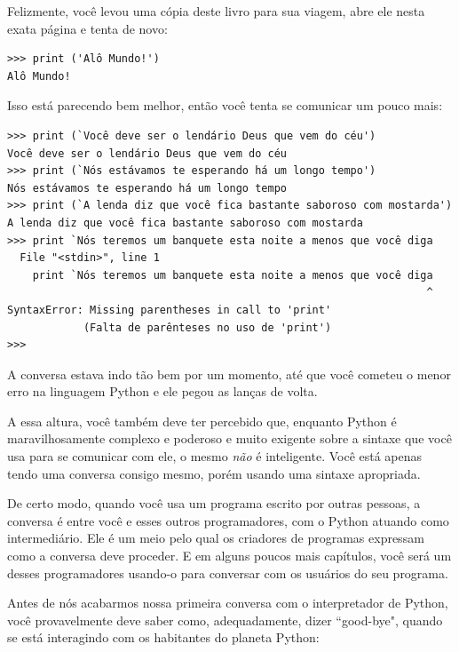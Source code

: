 Felizmente, você levou uma cópia deste livro para sua viagem, abre ele nesta exata página e tenta de novo:

\begin{verbatim}
>>> print ('Alô Mundo!')
Alô Mundo!
\end{verbatim}

%
Isso está parecendo bem melhor, então você tenta se comunicar um pouco mais:


\begin{verbatim}
>>> print (`Você deve ser o lendário Deus que vem do céu')
Você deve ser o lendário Deus que vem do céu
>>> print (`Nós estávamos te esperando há um longo tempo')
Nós estávamos te esperando há um longo tempo
>>> print (`A lenda diz que você fica bastante saboroso com mostarda')
A lenda diz que você fica bastante saboroso com mostarda
>>> print `Nós teremos um banquete esta noite a menos que você diga
  File "<stdin>", line 1
    print `Nós teremos um banquete esta noite a menos que você diga
                                                                  ^
SyntaxError: Missing parentheses in call to 'print'
            (Falta de parênteses no uso de 'print')
>>> 
\end{verbatim}

%
A conversa estava indo tão bem por um momento, até que você cometeu o menor erro na linguagem Python e ele pegou as lanças de volta. 

A essa altura, você também deve ter percebido que, enquanto Python é maravilhosamente complexo e poderoso e muito exigente sobre a sintaxe que você usa para se comunicar com ele, o mesmo {\em não} é inteligente. Você está apenas tendo uma conversa consigo mesmo, porém usando uma sintaxe apropriada.

De certo modo, quando você usa um programa escrito por outras pessoas, a conversa é entre você e esses outros programadores, com o Python atuando como intermediário. Ele é um meio pelo qual os criadores de programas expressam como a conversa deve proceder. E em alguns poucos mais capítulos, você será um desses programadores usando-o para conversar com os usuários do seu programa.

Antes de nós acabarmos nossa primeira conversa com o interpretador de Python, você provavelmente deve saber como, adequadamente, dizer ``good-bye", quando se está interagindo com os habitantes do planeta Python:

